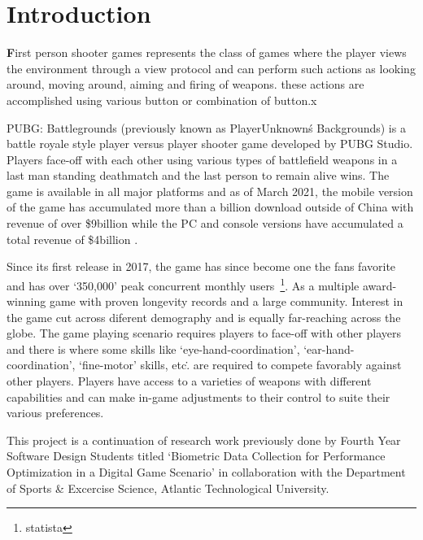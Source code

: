 \chapter{Introduction}

\textbf{F}irst person shooter games represents the class of games where the  player views the environment through a view protocol
    and can perform such actions as looking around, moving around, aiming and firing of weapons. these actions are accomplished
    using various button or combination of button.x 
    

    PUBG: Battlegrounds (previously known as PlayerUnknown\'s Backgrounds) is a battle royale style player versus
    player shooter game developed by PUBG Studio. Players face-off with each other using various types of battlefield weapons
    in a last man standing deathmatch and the last person to remain alive wins. The game is available in all major platforms
    and as of March 2021, the mobile version of the game has accumulated more than a billion download outside of China with 
    revenue of over \$9billion while the PC and console versions have accumulated a total revenue of \$4billion
    \cite{statista}.
    \par 
    Since its first release in 2017, the game has since become one the fans favorite and has over `350,000' peak concurrent 
    monthly users~\footnote{statista}. As a multiple award-winning game with proven longevity records and a large community.
    Interest in the game cut across diferent demography and is equally far-reaching across the globe. 
    The game playing scenario requires players to face-off with other players and there is where some skills like 
    `eye-hand-coordination', `ear-hand-coordination', `fine-motor' skills, etc\.. are required to compete favorably against 
    other players. Players have access to a varieties of weapons with different capabilities and can make in-game adjustments
    to their control to suite their various preferences.
    
    

    This project is a continuation of research work previously done by Fourth Year Software Design Students titled `Biometric 
    Data Collection for Performance Optimization in a Digital Game Scenario' in collaboration with the Department of Sports
     \& Excercise Science, Atlantic Technological University.
